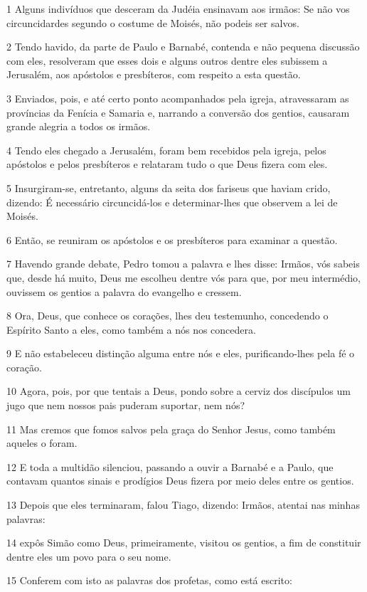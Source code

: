 \par 1 Alguns indivíduos que desceram da Judéia ensinavam aos irmãos: Se não vos circuncidardes segundo o costume de Moisés, não podeis ser salvos.
\par 2 Tendo havido, da parte de Paulo e Barnabé, contenda e não pequena discussão com eles, resolveram que esses dois e alguns outros dentre eles subissem a Jerusalém, aos apóstolos e presbíteros, com respeito a esta questão.
\par 3 Enviados, pois, e até certo ponto acompanhados pela igreja, atravessaram as províncias da Fenícia e Samaria e, narrando a conversão dos gentios, causaram grande alegria a todos os irmãos.
\par 4 Tendo eles chegado a Jerusalém, foram bem recebidos pela igreja, pelos apóstolos e pelos presbíteros e relataram tudo o que Deus fizera com eles.
\par 5 Insurgiram-se, entretanto, alguns da seita dos fariseus que haviam crido, dizendo: É necessário circuncidá-los e determinar-lhes que observem a lei de Moisés.
\par 6 Então, se reuniram os apóstolos e os presbíteros para examinar a questão.
\par 7 Havendo grande debate, Pedro tomou a palavra e lhes disse: Irmãos, vós sabeis que, desde há muito, Deus me escolheu dentre vós para que, por meu intermédio, ouvissem os gentios a palavra do evangelho e cressem.
\par 8 Ora, Deus, que conhece os corações, lhes deu testemunho, concedendo o Espírito Santo a eles, como também a nós nos concedera.
\par 9 E não estabeleceu distinção alguma entre nós e eles, purificando-lhes pela fé o coração.
\par 10 Agora, pois, por que tentais a Deus, pondo sobre a cerviz dos discípulos um jugo que nem nossos pais puderam suportar, nem nós?
\par 11 Mas cremos que fomos salvos pela graça do Senhor Jesus, como também aqueles o foram.
\par 12 E toda a multidão silenciou, passando a ouvir a Barnabé e a Paulo, que contavam quantos sinais e prodígios Deus fizera por meio deles entre os gentios.
\par 13 Depois que eles terminaram, falou Tiago, dizendo: Irmãos, atentai nas minhas palavras:
\par 14 expôs Simão como Deus, primeiramente, visitou os gentios, a fim de constituir dentre eles um povo para o seu nome.
\par 15 Conferem com isto as palavras dos profetas, como está escrito:
